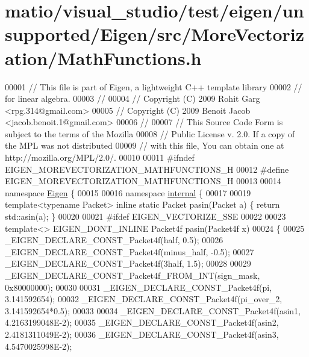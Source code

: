 \hypertarget{matio_2visual__studio_2test_2eigen_2unsupported_2_eigen_2src_2_more_vectorization_2_math_functions_8h_source}{}\section{matio/visual\+\_\+studio/test/eigen/unsupported/\+Eigen/src/\+More\+Vectorization/\+Math\+Functions.h}
\label{matio_2visual__studio_2test_2eigen_2unsupported_2_eigen_2src_2_more_vectorization_2_math_functions_8h_source}

\begin{DoxyCode}
00001 \textcolor{comment}{// This file is part of Eigen, a lightweight C++ template library}
00002 \textcolor{comment}{// for linear algebra.}
00003 \textcolor{comment}{//}
00004 \textcolor{comment}{// Copyright (C) 2009 Rohit Garg <rpg.314@gmail.com>}
00005 \textcolor{comment}{// Copyright (C) 2009 Benoit Jacob <jacob.benoit.1@gmail.com>}
00006 \textcolor{comment}{//}
00007 \textcolor{comment}{// This Source Code Form is subject to the terms of the Mozilla}
00008 \textcolor{comment}{// Public License v. 2.0. If a copy of the MPL was not distributed}
00009 \textcolor{comment}{// with this file, You can obtain one at http://mozilla.org/MPL/2.0/.}
00010 
00011 \textcolor{preprocessor}{#ifndef EIGEN\_MOREVECTORIZATION\_MATHFUNCTIONS\_H}
00012 \textcolor{preprocessor}{#define EIGEN\_MOREVECTORIZATION\_MATHFUNCTIONS\_H}
00013 
00014 \textcolor{keyword}{namespace }\hyperlink{namespace_eigen}{Eigen} \{ 
00015 
00016 \textcolor{keyword}{namespace }\hyperlink{namespaceinternal}{internal} \{
00017 
00019 \textcolor{keyword}{template}<\textcolor{keyword}{typename} Packet> \textcolor{keyword}{inline} \textcolor{keyword}{static} Packet pasin(Packet a) \{ \textcolor{keywordflow}{return} std::asin(a); \}
00020 
00021 \textcolor{preprocessor}{#ifdef EIGEN\_VECTORIZE\_SSE}
00022 
00023 \textcolor{keyword}{template}<> EIGEN\_DONT\_INLINE Packet4f pasin(Packet4f x)
00024 \{
00025   \_EIGEN\_DECLARE\_CONST\_Packet4f(half, 0.5);
00026   \_EIGEN\_DECLARE\_CONST\_Packet4f(minus\_half, -0.5);
00027   \_EIGEN\_DECLARE\_CONST\_Packet4f(3half, 1.5);
00028 
00029   \_EIGEN\_DECLARE\_CONST\_Packet4f\_FROM\_INT(sign\_mask, 0x80000000);
00030 
00031   \_EIGEN\_DECLARE\_CONST\_Packet4f(pi, 3.141592654);
00032   \_EIGEN\_DECLARE\_CONST\_Packet4f(pi\_over\_2, 3.141592654*0.5);
00033 
00034   \_EIGEN\_DECLARE\_CONST\_Packet4f(asin1, 4.2163199048E-2);
00035   \_EIGEN\_DECLARE\_CONST\_Packet4f(asin2, 2.4181311049E-2);
00036   \_EIGEN\_DECLARE\_CONST\_Packet4f(asin3, 4.5470025998E-2);

\end{DoxyCode}
